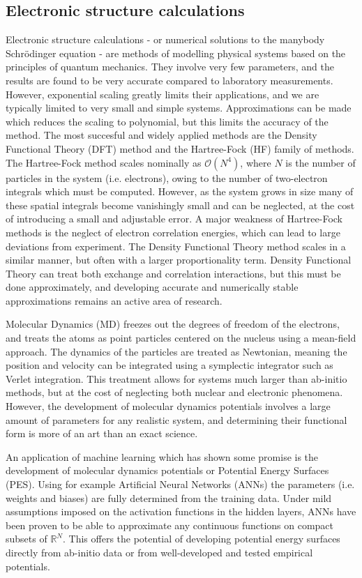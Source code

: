 \subsection{Electronic structure calculations}
Electronic structure calculations - or numerical solutions
to the manybody Schr\"{o}dinger equation - are methods of modelling
physical systems based on the principles of quantum mechanics.
They involve very few parameters, and the results are found
to be very accurate compared to laboratory measurements.
However, exponential scaling greatly limits their applications,
and we are typically limited to very small and simple systems.
Approximations can be made which reduces the scaling
to polynomial, but this limits the accuracy of the method.
The most succesful and widely applied methods
are the Density Functional Theory (DFT) method
and the Hartree-Fock (HF) family of methods.
The Hartree-Fock method scales nominally as $\mathcal{O}(N^4)$,
where $N$ is the number of particles in the system
(i.e. electrons), owing to the number of two-electron
integrals which must be computed.
However, as the system grows in size many of these spatial integrals
become vanishingly small and can be neglected, at the cost of
introducing a small and adjustable error.
A major weakness of Hartree-Fock methods is the neglect
of electron correlation energies, which can lead to
large deviations from experiment.
The Density Functional Theory method scales in a similar
manner, but often with a larger proportionality term.
Density Functional Theory can treat both exchange and correlation
interactions, but this must be done approximately,
and developing accurate and numerically stable approximations
remains an active area of research.
\par
Molecular Dynamics (MD) freezes out the degrees of freedom of the
electrons, and treats the atoms as point particles centered on
the nucleus using a mean-field approach.
The dynamics of the particles are treated as Newtonian,
meaning the position and velocity can be integrated using a
symplectic integrator such as Verlet integration.
This treatment allows for systems much larger
than ab-initio methods, but at the cost of neglecting
both nuclear and electronic phenomena.
However, the development of molecular dynamics potentials
involves a large amount of parameters for any realistic system,
and determining their functional form is more of an
art than an exact science.
\par
An application of machine learning which has shown some promise
is the development of molecular dynamics potentials
or Potential Energy Surfaces (PES). Using for example
Artificial Neural Networks (ANNs) the parameters (i.e. weights and biases)
are fully determined from the training data.
Under mild assumptions imposed on the activation functions in the
hidden layers, ANNs have been proven to be able to approximate
any continuous functions on compact subsets of $\mathbb{R}^N$.
This offers the potential of developing potential energy surfaces
directly from ab-initio data or from well-developed and tested
empirical potentials.

